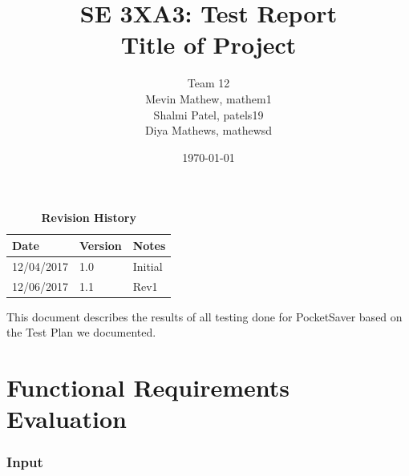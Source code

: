 \documentclass[12pt, titlepage]{article}
\title{SE 3XA3: Test Report\\Title of Project}
\author{Team 12
		\\ Mevin Mathew, mathem1
		\\ Shalmi Patel, patels19
		\\ Diya Mathews, mathewsd
}
\date{\today}
\begin{document}
\maketitle

\tableofcontents
\listoftables
\listoffigures

\begin{table}[bp]
\caption{\bf Revision History}
\begin{tabularx}{\textwidth}{p{3cm}p{2cm}X}
\toprule {\bf Date} & {\bf Version} & {\bf Notes}\\
\midrule
12/04/2017 & 1.0 & Initial\\
12/06/2017 & 1.1 & Rev1\\
\bottomrule
\end{tabularx}
\end{table}

\newpage


This document describes the results of all testing done for PocketSaver based on the Test Plan we documented.

\section{Functional Requirements Evaluation}
\subsubsection{Input}
\end{document}
